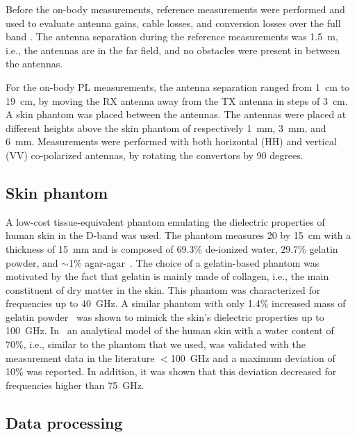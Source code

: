 \documentclass[preprint]{rsl}
\begin{document}
Before the on-body measurements, reference measurements were performed and used to evaluate antenna gains, cable losses, and conversion losses over the full band \cite{DeBeelde2021_eucap}. 
The antenna separation during the reference measurements was 1.5~m, i.e., the antennas are in the far field, and no obstacles were present in between the antennas. 

For the on-body PL measurements, the antenna separation ranged from 1~cm to 19~cm, by moving the RX antenna away from the TX antenna in steps of 3~cm.
A skin phantom was placed between the antennas. 
The antennas were placed at different heights above the skin phantom of respectively 1~mm, 3~mm, and 6~mm. 
Measurements were performed with both horizontal (HH) and vertical (VV) co-polarized antennas, by rotating the convertors by 90 degrees.

\subsection{Skin phantom}

A low-cost tissue-equivalent phantom emulating the dielectric properties of human skin in the D-band was used. 
The phantom measures 20 by 15~cm with a thickness of 15~mm and is composed of 69.3\% de-ionized water, 29.7\% gelatin powder, and $\sim$1\% agar-agar~\cite{aminzadeh2014_ELetters}. 
The choice of a gelatin-based phantom was motivated by the fact that gelatin is mainly made of collagen, i.e., the main constituent of dry matter in the skin. 
This phantom was characterized for frequencies up to 40~GHz. 
A similar phantom with only 1.4\% increased mass of gelatin powder~\cite{aminzadeh2017_awpl} was shown to mimick the skin's dielectric properties up to 100~GHz. 
In~\cite{aminzadeh2014_thesis} an analytical model of the human skin with a water content of 70\%, i.e., similar to the phantom that we used, was validated with the measurement data in the literature $<$100~GHz and a maximum deviation of 10\% was reported. 
In addition, it was shown that this deviation decreased for frequencies higher than 75~GHz.

\subsection{Data processing}
\end{document}
